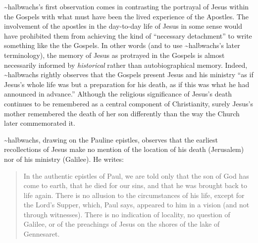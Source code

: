 \textasciitilde{}halbwachs's first observation comes in contrasting the
portrayal of Jesus within the Gospels with what must have been the lived
experience of the Apostles.\autocite[193--198]{halbwachs1992} The
involvement of the apostles in the day-to-day life of Jesus in some
sense would have prohibited them from achieving the kind of ``necessary
detachment'' to write something like the the Gospels. In other words
(and to use \textasciitilde{}halbwachs's later terminology), the memory
of Jesus as protrayed in the Gospels is almost necessarily informed by
\emph{historical} rather than autobiographical
memory.\autocite[194]{halbwachs1992} Indeed, \textasciitilde{}halbwachs
rightly observes that the Gospels present Jesus and his ministry ``as if
Jesus's whole life was but a preparation for his death, as if this was
what he had announced in advance.''\autocite[198]{halbwachs1992}
Although the religious significance of Jesus's death continues to be
remembered as a central component of Christianity, surely Jesus's mother
remembered the death of her son differently than the way the Church
later commemorated it.\autocites[Regardless of whether
\textasciitilde{}halbwachs's conception of Early Christianity would be
considered sound today, the idea that the Gospels represent several
collective remembrances of Jesus's life, ministry and death each bearing
marks from their own \emph{Sitz im Leben} (to borrow from the form
critics) seems relatively uncontroversial. A number of studies on the
Jesus and early Christian memory have come about in the past several
years. See][]{ledonne2009}{rodriguez2010}[For an overview of the modern
impact of \textasciitilde{}halbwachs (and memory studies more generally)
on the field of Historical Jesus studies,
see][]{keith_ec2015}[and][]{keith_ec2015b}

\textasciitilde{}halbwachs, drawing on the Pauline epistles, observes
that the earliest recollections of Jesus make no mention of the location
of his death (Jerusalem) nor of his ministry (Galilee). He writes:

\begin{quote}
In the authentic epistles of Paul, we are told only that the son of God
has come to earth, that he died for our sins, and that he was brought
back to life again. There is no allusion to the circumstances of his
life, except for the Lord's Supper, which, Paul says, appeared to him in
a vision (and not through witnesses). There is no indication of
locality, no question of Galilee, or of the preachings of Jesus on the
shores of the lake of Gennesaret.\autocite[209]{halbwachs1992}
\end{quote}

